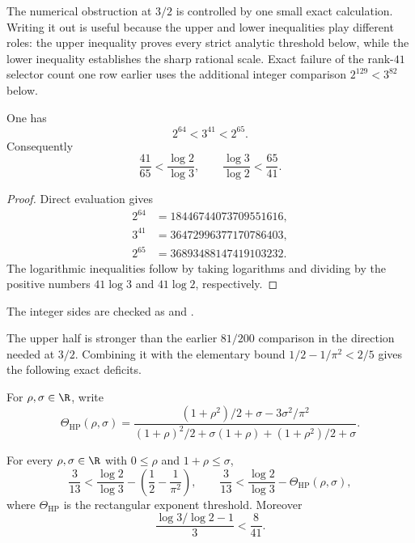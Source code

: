 \documentclass[11pt]{article}
\begin{document}
The numerical obstruction at $3/2$ is controlled by one small exact
calculation.  Writing it out is useful because the upper and lower inequalities
play different roles: the upper inequality proves every strict analytic
threshold below, while the lower inequality establishes the sharp rational
scale.  Exact failure of the rank-$41$ selector count one row earlier uses the
additional integer comparison $2^{129}<3^{82}$ below.

\begin{theorem}\label{long1049:res:powerbracket}
One has
\[
 2^{64}<3^{41}<2^{65}.
\]
Consequently
\[
 \frac{41}{65}<\frac{\log2}{\log3},
 \qquad
 \frac{\log3}{\log2}<\frac{65}{41}.
\]
\end{theorem}

\begin{proof}
Direct evaluation gives
\[
 \begin{aligned}
 2^{64}&=18446744073709551616,\\
 3^{41}&=36472996377170786403,\\
 2^{65}&=36893488147419103232.
 \end{aligned}
\]
The logarithmic inequalities follow by taking logarithms and dividing by the
positive numbers $41\log3$ and $41\log2$, respectively.
\end{proof}

\noindent The integer sides are checked as
and
.

The upper half is stronger than the earlier $81/200$ comparison in the
direction needed at $3/2$.  Combining it with the elementary bound
$1/2-1/\pi^2<2/5$ gives the following exact deficits.

For $\rho,\sigma\in\R$, write
\[
 \Theta_{\mathrm{HP}}(\rho,\sigma)=
 \frac{(1+\rho^2)/2+\sigma-3\sigma^2/\pi^2}
 {(1+\rho)^2/2+\sigma(1+\rho)+(1+\rho^2)/2+\sigma}.
\]

\begin{corollary}\label{long1049:res:sharpgaps}
For every $\rho,\sigma\in\R$ with $0\le\rho$ and $1+\rho\le\sigma$,
\[
 \frac3{13}<\frac{\log2}{\log3}
   -\left(\frac12-\frac1{\pi^2}\right),
 \qquad
 \frac3{13}<\frac{\log2}{\log3}-\Theta_{\mathrm{HP}}(\rho,\sigma),
\]
where $\Theta_{\mathrm{HP}}$ is the rectangular exponent threshold.  Moreover
\[
 \frac{\log3/\log2-1}{3}<\frac8{41}.
\]
\end{corollary}
\end{document}
